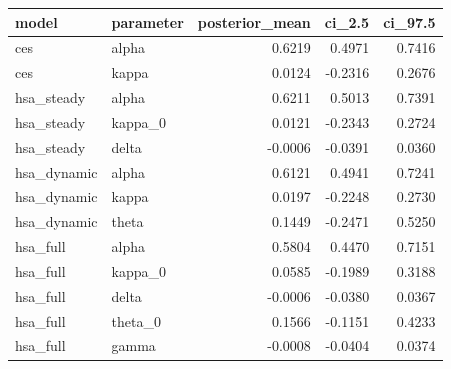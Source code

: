 \begin{tabular}{llrrr}
\toprule
model & parameter & posterior\_mean & ci\_2.5 & ci\_97.5 \\
\midrule
ces & alpha & 0.6219 & 0.4971 & 0.7416 \\
ces & kappa & 0.0124 & -0.2316 & 0.2676 \\
hsa\_steady & alpha & 0.6211 & 0.5013 & 0.7391 \\
hsa\_steady & kappa\_0 & 0.0121 & -0.2343 & 0.2724 \\
hsa\_steady & delta & -0.0006 & -0.0391 & 0.0360 \\
hsa\_dynamic & alpha & 0.6121 & 0.4941 & 0.7241 \\
hsa\_dynamic & kappa & 0.0197 & -0.2248 & 0.2730 \\
hsa\_dynamic & theta & 0.1449 & -0.2471 & 0.5250 \\
hsa\_full & alpha & 0.5804 & 0.4470 & 0.7151 \\
hsa\_full & kappa\_0 & 0.0585 & -0.1989 & 0.3188 \\
hsa\_full & delta & -0.0006 & -0.0380 & 0.0367 \\
hsa\_full & theta\_0 & 0.1566 & -0.1151 & 0.4233 \\
hsa\_full & gamma & -0.0008 & -0.0404 & 0.0374 \\
\bottomrule
\end{tabular}
